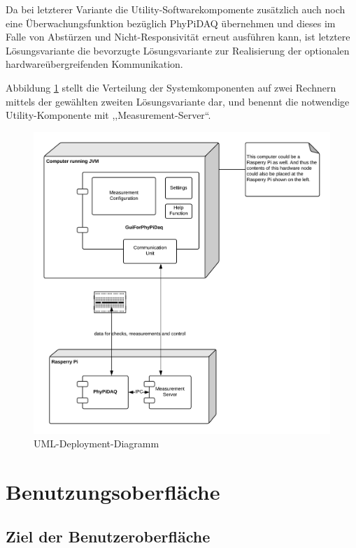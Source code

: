\documentclass[parskip=full]{scrartcl}
\begin{document}
Da bei letzterer Variante die Utility-Softwarekompomente zusätzlich auch noch eine Überwachungsfunktion bezüglich PhyPiDAQ übernehmen und dieses im Falle von Abstürzen und Nicht-Responsivität erneut ausführen kann, ist letztere Lösungsvariante die bevorzugte Lösungsvariante zur Realisierung der optionalen hardwareübergreifenden Kommunikation. 

Abbildung \ref{DeploymentDiagram} stellt die Verteilung der Systemkomponenten auf zwei Rechnern mittels der gewählten zweiten Lösungsvariante dar, und benennt die notwendige Utility-Komponente mit ,,Measurement-Server``. 
 

\begin{figure}[h]
	\begin{center}
		\includegraphics[width = 12cm]{Grafik/DeploymentDiagram.png}
		\caption{UML-Deployment-Diagramm}
		\label{DeploymentDiagram}
	\end{center}
\end{figure}

\clearpage
\section{Benutzungsoberfläche}\label{gui}

\subsection{Ziel der Benutzeroberfläche}
\end{document}
